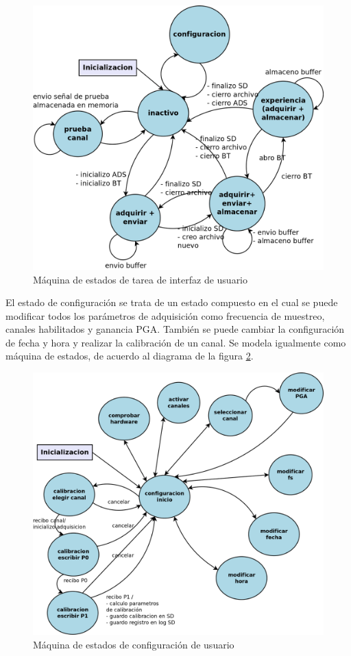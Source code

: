 \begin{figure}[!htbp]
	\centering
	\includegraphics[scale=0.18]{./Figures/VOP_mde_v1.png}
	\caption{Máquina de estados de tarea de interfaz de usuario}
	\label{fig:VOP_mde_v1}
\end{figure}


El estado de configuración se trata de un estado compuesto en el cual se puede modificar todos los parámetros de adquisición como frecuencia de muestreo, canales habilitados y ganancia PGA. También se  puede cambiar la configuración de fecha y hora y realizar la calibración de un canal. Se modela igualmente como máquina de estados, de acuerdo al diagrama de la figura \ref{fig:VOP24_configuracion_v1}.

\begin{figure}[!htbp]
	\centering
	\includegraphics[scale=0.14]{./Figures/VOP24_configuracion_v1.png}
	\caption{Máquina de estados de configuración de usuario}
	\label{fig:VOP24_configuracion_v1}
\end{figure}

